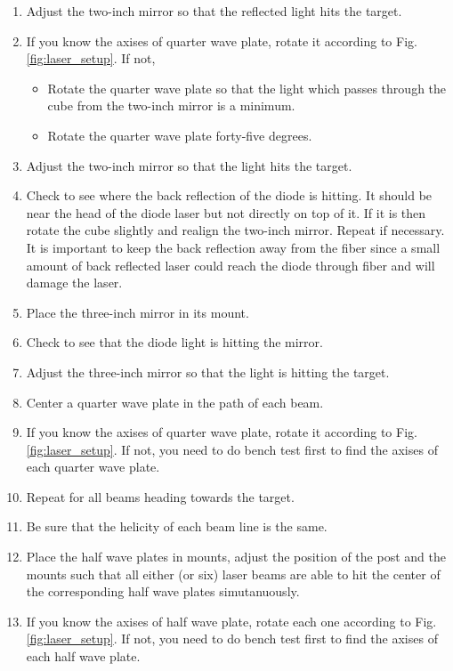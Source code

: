 {\begin{enumerate}
  center.
\item Adjust the two-inch mirror so that the reflected light hits 
  the target.
\item If you know the axises of quarter wave plate, rotate it according to 
      Fig. \ref{fig:laser_setup}.  If not, 
\begin{itemize}
\item Rotate the quarter wave plate so that the light which passes
  through the cube from the two-inch mirror is a minimum.
\item Rotate the quarter wave plate forty-five degrees.
\end{itemize}
\item Adjust the two-inch mirror so that the light hits the target.
\item Check to see where the back reflection of the diode is hitting. It
  should be near the head of the diode laser but not directly on top of
  it. If it is then rotate the cube slightly and realign the two-inch
  mirror. Repeat if necessary.  It is important to keep the back reflection
  away from the fiber since a small amount of back reflected laser could reach 
  the diode through fiber and will damage the laser.
\item Place the three-inch mirror in its mount.
\item Check to see that the diode light is hitting the mirror.
\item Adjust the three-inch mirror so that the light is hitting the
  target.
\item Center a quarter wave plate in the path of each beam.
\item If you know the axises of quarter wave plate, rotate it according to 
      Fig. \ref{fig:laser_setup}.  If not, you need to do bench test first to 
      find the axises of each quarter wave plate.
\item Repeat for all beams heading towards the target.
\item Be sure that the helicity of each beam line is the same.
\item Place the half wave plates in mounts, adjust the position of the post 
      and the mounts such that all either (or six) laser beams are able to 
      hit the center of the corresponding half wave plates simutanuously.
\item If you know the axises of half wave plate, rotate each one according 
      to Fig. \ref{fig:laser_setup}. If not, you need to do bench test first to 
      find the axises of each half wave plate.
\end{enumerate}

}
